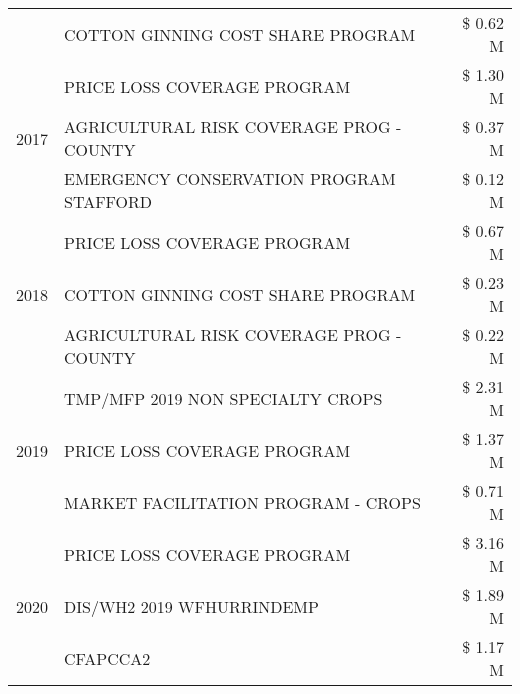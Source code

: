 \begin{tabular}{llr}
 & COTTON GINNING COST SHARE PROGRAM & \$ 0.62 M \\
\cline{1-3}
\multirow[t]{3}{*}{2017} & PRICE LOSS COVERAGE PROGRAM & \$ 1.30 M \\
 & AGRICULTURAL RISK COVERAGE PROG - COUNTY & \$ 0.37 M \\
 & EMERGENCY CONSERVATION PROGRAM STAFFORD & \$ 0.12 M \\
\cline{1-3}
\multirow[t]{3}{*}{2018} & PRICE LOSS COVERAGE PROGRAM & \$ 0.67 M \\
 & COTTON GINNING COST SHARE PROGRAM & \$ 0.23 M \\
 & AGRICULTURAL RISK COVERAGE PROG - COUNTY & \$ 0.22 M \\
\cline{1-3}
\multirow[t]{3}{*}{2019} & TMP/MFP 2019 NON SPECIALTY CROPS & \$ 2.31 M \\
 & PRICE LOSS COVERAGE PROGRAM & \$ 1.37 M \\
 & MARKET FACILITATION PROGRAM - CROPS & \$ 0.71 M \\
\cline{1-3}
\multirow[t]{3}{*}{2020} & PRICE LOSS COVERAGE PROGRAM & \$ 3.16 M \\
 & DIS/WH2 2019 WFHURRINDEMP & \$ 1.89 M \\
 & CFAPCCA2 & \$ 1.17 M \\
\cline{1-3}
\bottomrule
\end{tabular}
